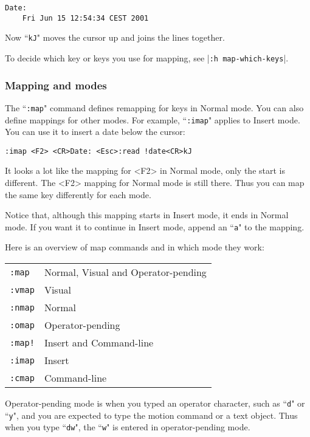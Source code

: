 \begin{Verbatim}[samepage=true]
    Date:
    Fri Jun 15 12:54:34 CEST 2001
\end{Verbatim}

Now ``\texttt{kJ}" moves the cursor up and joins the lines together.

To decide which key or keys you use for mapping, see |\texttt{:h map-which-keys}|.

\subsubsection{Mapping and modes}
The ``\texttt{:map}" command defines remapping for keys in Normal mode.
You can also define mappings for other modes.
For example, ``\texttt{:imap}" applies to Insert mode.
You can use it to insert a date below the cursor:

\begin{Verbatim}[samepage=true]
 :imap <F2> <CR>Date: <Esc>:read !date<CR>kJ
\end{Verbatim}

It looks a lot like the mapping for <F2> in Normal mode, only the start is different.
The <F2> mapping for Normal mode is still there.
Thus you can map the same key differently for each mode.

Notice that, although this mapping starts in Insert mode, it ends in Normal mode.
If you want it to continue in Insert mode, append an ``\texttt{a}" to the mapping.

Here is an overview of map commands and in which mode they work:
\begin{center} \begin{tabular}{l l}
				\texttt{:map} & Normal, Visual and Operator-pending \\
				\texttt{:vmap} & Visual \\
				\texttt{:nmap} & Normal \\
				\texttt{:omap} & Operator-pending \\
				\texttt{:map!} & Insert and Command-line \\
				\texttt{:imap} & Insert \\
				\texttt{:cmap} & Command-line \\
\end{tabular} \end{center}

Operator-pending mode is when you typed an operator character, such as ``\texttt{d}" or ``\texttt{y}", and you are expected to type the motion command or a text object.
Thus when you type ``\texttt{dw}", the ``\texttt{w}" is entered in operator-pending mode.

